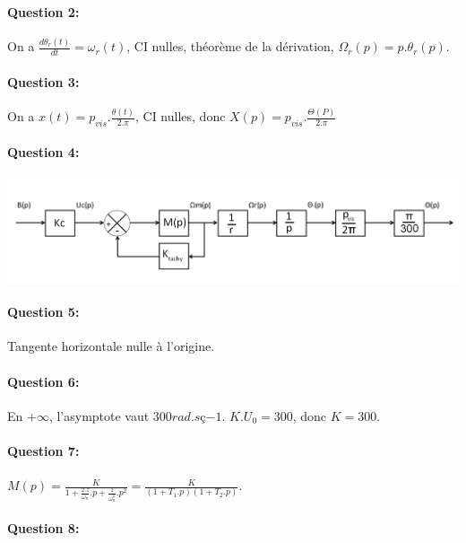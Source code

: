 \paragraph{Question 2:}

On a $\frac{d\theta_r(t)}{dt}=\omega_r(t)$, CI nulles, théorème de la dérivation, $\Omega_r(p)=p.\theta_r(p)$.

\paragraph{Question 3:}

On a $x(t)=p_{vis}.\frac{\theta(t)}{2.\pi}$, CI nulles, donc $X(p)=p_{vis}.\frac{\Theta(P)}{2.\pi}$

\paragraph{Question 4:}

\begin{center}
  \includegraphics[width=0.9\linewidth]{img/rep2_cor}
\end{center}

\paragraph{Question 5:}

Tangente horizontale nulle à l'origine.

\paragraph{Question 6:}

En $+\infty$, l'asymptote vaut $300rad.sç{-1}$. $K.U_0=300$, donc $K=300$.

\paragraph{Question 7:}

$M(p)=\frac{K}{1+\frac{2.z}{\omega_n}.p+\frac{1}{\omega_n^2}.p^2}=\frac{K}{(1+T_1.p)(1+T_2.p)}$.

\paragraph{Question 8:}

